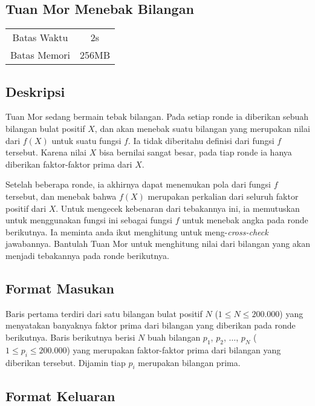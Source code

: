 \documentclass{article}
\begin{document}
\begin{center}
    \section*{Tuan Mor Menebak Bilangan}

    \begin{tabular}{ | c c | }
        \hline
        Batas Waktu  & 2s \\ 
        Batas Memori & 256MB \\ 
        \hline
    \end{tabular}
\end{center}

\subsection*{Deskripsi}

Tuan Mor sedang bermain tebak bilangan. Pada setiap ronde ia diberikan sebuah bilangan bulat positif $X$, dan akan menebak suatu bilangan yang merupakan nilai dari $f(X)$ untuk suatu fungsi $f$. Ia tidak diberitahu definisi dari fungsi $f$ tersebut. Karena nilai $X$ bisa bernilai sangat besar, pada tiap ronde ia hanya diberikan faktor-faktor prima dari $X$. 

Setelah beberapa ronde, ia akhirnya dapat menemukan pola dari fungsi $f$ tersebut, dan menebak bahwa $f(X)$ merupakan perkalian dari seluruh faktor positif dari $X$. Untuk mengecek kebenaran dari tebakannya ini, ia memutuskan untuk menggunakan fungsi ini sebagai fungsi $f$ untuk menebak angka pada ronde berikutnya. Ia meminta anda ikut menghitung untuk meng-\textit{cross-check} jawabannya. Bantulah Tuan Mor untuk menghitung nilai dari bilangan yang akan menjadi tebakannya pada ronde berikutnya.

\subsection*{Format Masukan}

Baris pertama terdiri dari satu bilangan bulat positif $N$ ($1 \leq N \leq 200.000$) yang menyatakan banyaknya faktor prima dari bilangan yang diberikan pada ronde berikutnya.
Baris berikutnya berisi $N$ buah bilangan $p_1$, $p_2$, $\dots$, $p_N$ ($1 \leq p_i \leq 200.000$) yang merupakan faktor-faktor prima dari bilangan yang diberikan tersebut. Dijamin tiap $p_i$ merupakan bilangan prima.

\subsection*{Format Keluaran}
\end{document}
